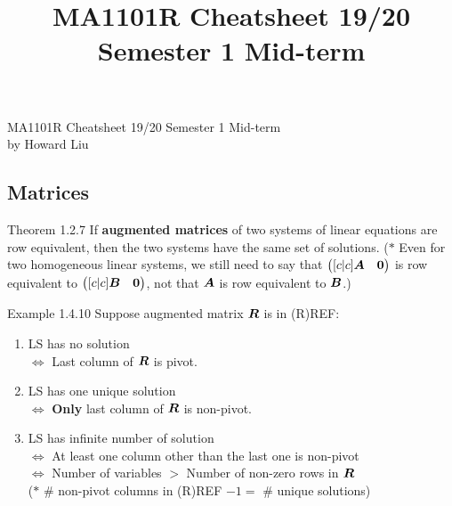 \documentclass[11pt,landscape]{article}
\title{MA1101R Cheatsheet 19/20 Semester 1 Mid-term}
\begin{document}
\begin{center}
{\large MA1101R Cheatsheet 19/20 Semester 1 Mid-term}\\{by Howard Liu}
\end{center}

\footnotesize

\begin{multicols}{2}
\begin{justifying}

\setlength{\premulticols}{1pt}
\setlength{\postmulticols}{1pt}
\setlength{\multicolsep}{1pt}
\setlength{\columnsep}{2pt}

\section{Matrices}

\begin{namedthm*}{Theorem 1.2.7}
	If \textbf{augmented matrices} of two systems of linear equations are row equivalent, then the two systems have the same set of solutions. (\(\ast\) Even for two homogeneous linear systems, we still need to say that \(\begin{pmatrix}[c|c]\bm{A} & \bm{0}\end{pmatrix}\) is row equivalent to \(\begin{pmatrix}[c|c]\bm{B} & \bm{0}\end{pmatrix}\), not that \(\bm{A}\) is row equivalent to \(\bm{B}\).)
\end{namedthm*}

\begin{namedthm*}{Example 1.4.10}
	Suppose augmented matrix \(\bm{R}\) is in (R)REF:
	\begin{enumerate}
		\item LS has no solution \\
		    \(\iff\) Last column of \(\bm{R}\) is pivot.
		\item LS has one unique solution \\
		    \(\iff\) \textbf{Only} last column of \(\bm{R}\) is non-pivot.
		\item LS has infinite number of solution \\
		    \(\iff\) At least one column other than the last one is non-pivot \\
		    \(\iff\) Number of variables $>$ Number of non-zero rows in \(\bm{R}\) \\
		(\(\ast\) \# non-pivot columns in (R)REF \(- 1 =\) \# unique solutions)
	\end{enumerate}
\end{namedthm*}


\end{justifying}
\end{multicols}
\end{document}
